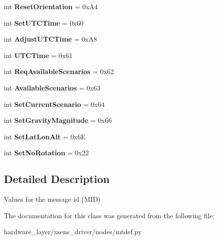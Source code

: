 \begin{DoxyCompactItemize}
int {\bfseries Reset\+Orientation} = 0x\+A4
\item 
\mbox{\label{classmtdef_1_1MID_a165cef4c0471d85ff9c6433155ed7449}} 
int {\bfseries Set\+U\+T\+C\+Time} = 0x60
\item 
\mbox{\label{classmtdef_1_1MID_a33ec12e824204a8df5296c6bd20bca1f}} 
int {\bfseries Adjust\+U\+T\+C\+Time} = 0x\+A8
\item 
\mbox{\label{classmtdef_1_1MID_a9366b31f88d01b28c1264d6d6292a20d}} 
int {\bfseries U\+T\+C\+Time} = 0x61
\item 
\mbox{\label{classmtdef_1_1MID_a4f52564c54447fc61ac4d2513f4d3b65}} 
int {\bfseries Req\+Available\+Scenarios} = 0x62
\item 
\mbox{\label{classmtdef_1_1MID_a928e8ae1670ac2276c5cac1955a7b5ee}} 
int {\bfseries Available\+Scenarios} = 0x63
\item 
\mbox{\label{classmtdef_1_1MID_a1447b205b6f3e116321b6acfc79c7663}} 
int {\bfseries Set\+Current\+Scenario} = 0x64
\item 
\mbox{\label{classmtdef_1_1MID_a584b87e8df98fe1c7c7cf05d9a7b1888}} 
int {\bfseries Set\+Gravity\+Magnitude} = 0x66
\item 
\mbox{\label{classmtdef_1_1MID_a58a8acf07f7afa48ba8dd75a1eab21b0}} 
int {\bfseries Set\+Lat\+Lon\+Alt} = 0x6E
\item 
\mbox{\label{classmtdef_1_1MID_ade64c457447afcc5129bc3c91b5bd06a}} 
int {\bfseries Set\+No\+Rotation} = 0x22
\end{DoxyCompactItemize}


\subsection{Detailed Description}
\begin{DoxyVerb}Values for the message id (MID)\end{DoxyVerb}
 

The documentation for this class was generated from the following file\+:\begin{DoxyCompactItemize}
\item 
hardware\+\_\+layer/xsens\+\_\+driver/nodes/mtdef.\+py\end{DoxyCompactItemize}
